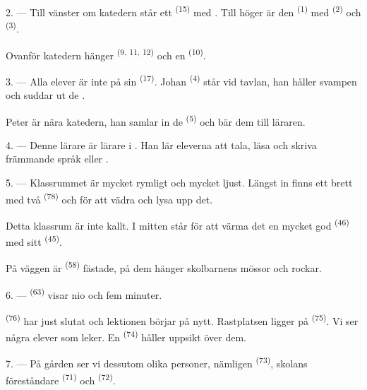 2. --- Till vänster om katedern står ett  \textsuperscript{(15)} med
. Till höger är den  \textsuperscript{(1)} med
 \textsuperscript{(2)} och
 \textsuperscript{(3)}.

Ovanför katedern hänger  \textsuperscript{(9, 11, 12)} och en
 \textsuperscript{(10)}.

3. --- Alla elever är inte på sin  \textsuperscript{(17)}. Johan
\textsuperscript{(4)} står vid tavlan, han håller svampen och suddar ut de
.

Peter är nära katedern, han samlar in de  \textsuperscript{(5)}
och bär dem till läraren.

4. --- Denne lärare är lärare i . Han lär eleverna att tala, läsa och
skriva främmande språk  eller
.

5. --- Klassrummet är mycket rymligt och mycket ljust. Längst in finns ett brett
 med två  \textsuperscript{(78)} och
 för att vädra och lysa upp det.

Detta klassrum är inte kallt. I mitten står för att värma det en mycket god
 \textsuperscript{(46)} med sitt 
\textsuperscript{(45)}.

På väggen är  \textsuperscript{(58)} fästade, på dem hänger skolbarnens
mössor och rockar.

\VUsaut{5.2mm}
\VUsaut{3.6mm}

6. ---  \textsuperscript{(63)} visar nio och fem minuter.

 \textsuperscript{(76)} har just slutat och lektionen börjar på
nytt. Rastplatsen ligger på  \textsuperscript{(75)}. Vi ser några elever som
leker. En  \textsuperscript{(74)} håller uppsikt över dem.

7. --- På gården ser vi dessutom olika personer, nämligen 
\textsuperscript{(73)}, skolans föreståndare  \textsuperscript{(71)} och
 \textsuperscript{(72)}.

